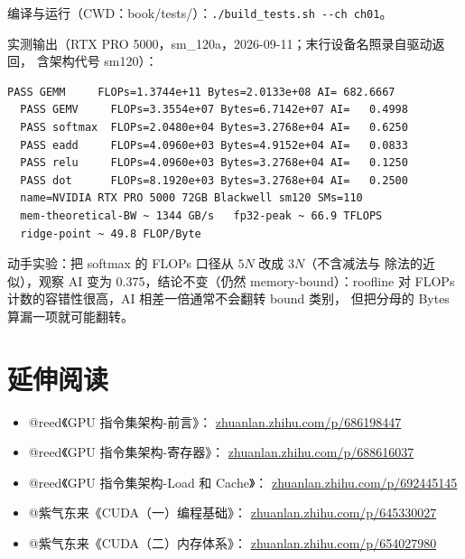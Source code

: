 编译与运行（CWD：book/tests/）：\texttt{.\allowbreak{}/\allowbreak{}build\_\allowbreak{}tests.\allowbreak{}sh -{}-ch ch01}。

实测输出（RTX PRO 5000，sm\_120a，2026-09-11；末行设备名照录自驱动返回，
含架构代号 sm120）：
\begin{lstlisting}[style=console]
  PASS GEMM     FLOPs=1.3744e+11 Bytes=2.0133e+08 AI= 682.6667
  PASS GEMV     FLOPs=3.3554e+07 Bytes=6.7142e+07 AI=   0.4998
  PASS softmax  FLOPs=2.0480e+04 Bytes=3.2768e+04 AI=   0.6250
  PASS eadd     FLOPs=4.0960e+03 Bytes=4.9152e+04 AI=   0.0833
  PASS relu     FLOPs=4.0960e+03 Bytes=3.2768e+04 AI=   0.1250
  PASS dot      FLOPs=8.1920e+03 Bytes=3.2768e+04 AI=   0.2500
  name=NVIDIA RTX PRO 5000 72GB Blackwell sm120 SMs=110
  mem-theoretical-BW ~ 1344 GB/s   fp32-peak ~ 66.9 TFLOPS
  ridge-point ~ 49.8 FLOP/Byte
\end{lstlisting}

动手实验：把 softmax 的 FLOPs 口径从 $5N$ 改成 $3N$（不含减法与
除法的近似），观察 AI 变为 0.375，结论不变（仍然 memory-bound）：roofline
对 FLOPs 计数的容错性很高，AI 相差一倍通常不会翻转 bound 类别，
但把分母的 Bytes 算漏一项就可能翻转。

\section*{延伸阅读}
\begin{itemize}
\item @reed《GPU 指令集架构-前言》：
  \href{https://zhuanlan.zhihu.com/p/686198447}{zhuanlan.zhihu.com/p/686198447}
\item @reed《GPU 指令集架构-寄存器》：
  \href{https://zhuanlan.zhihu.com/p/688616037}{zhuanlan.zhihu.com/p/688616037}
\item @reed《GPU 指令集架构-Load 和 Cache》：
  \href{https://zhuanlan.zhihu.com/p/692445145}{zhuanlan.zhihu.com/p/692445145}
\item @紫气东来《CUDA（一）编程基础》：
  \href{https://zhuanlan.zhihu.com/p/645330027}{zhuanlan.zhihu.com/p/645330027}
\item @紫气东来《CUDA（二）内存体系》：
  \href{https://zhuanlan.zhihu.com/p/654027980}{zhuanlan.zhihu.com/p/654027980}
\end{itemize}
